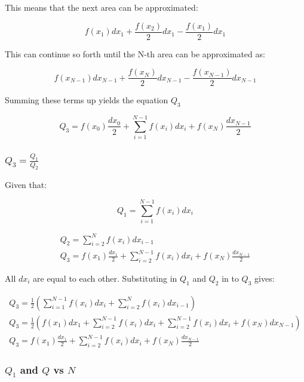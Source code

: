 \documentclass[12pt, a4paper]{article}
\begin{document}
				This means that the next area can be approximated:
				
				$$
				f\left(x_{1}\right) d x_{1}+\frac{f\left(x_{2}\right)}{2} d x_{1}-\frac{f\left(x_{1}\right)}{2} d x_{1}
				$$
				
				This can continue so forth until the $\mathrm{N}$-th area can be approximated as:
				
				$$
				f\left(x_{N-1}\right) d x_{N-1}+\frac{f\left(x_{N}\right)}{2} d x_{N-1}-\frac{f\left(x_{N-1}\right)}{2} d x_{N-1}
				$$
				
				Summing these terms up yields the equation $Q_{3}$
				
				$$
				Q_{3}=f\left(x_{0}\right) \frac{d x_{0}}{2}+\sum_{i=1}^{N-1} f\left(x_{i}\right) d x_{i}+f\left(x_{N}\right) \frac{d x_{N-1}}{2}
				$$
			\subsubsection{$Q_{3} = \frac{Q_{1}}{Q_{2}}$}				
				Given that:
				
				$$
				Q_{1}=\sum_{i=1}^{N-1} f\left(x_{i}\right) d x_{i}
				$$
				
				$$
				\begin{gathered}
					Q_{2}=\sum_{i=2}^{N} f\left(x_{i}\right) d x_{i-1} \\
					Q_{3}=f\left(x_{1}\right) \frac{d x_{1}}{2}+\sum_{i=2}^{N-1} f\left(x_{i}\right) d x_{i}+f\left(x_{N}\right) \frac{d x_{N-1}}{2}
				\end{gathered}
				$$
				
				All $d x_{i}$ are equal to each other. Substituting in $Q_{1}$ and $Q_{2}$ in to $Q_{3}$ gives:
				
				$$
				\begin{gathered}
					Q_{3}=\frac{1}{2}\left(\sum_{i=1}^{N-1} f\left(x_{i}\right) d x_{i}+\sum_{i=2}^{N} f\left(x_{i}\right) d x_{i-1}\right) \\
					Q_{3}=\frac{1}{2}\left(f\left(x_{1}\right) d x_{1}+\sum_{i=2}^{N-1} f\left(x_{i}\right) d x_{i}+\sum_{i=2}^{N-1} f\left(x_{i}\right) d x_{i}+f\left(x_{N}\right) d x_{N-1}\right) \\
					Q_{3}=f\left(x_{1}\right) \frac{d x_{1}}{2}+\sum_{i=2}^{N-1} f\left(x_{i}\right) d x_{i}+f\left(x_{N}\right) \frac{d x_{N-1}}{2}
				\end{gathered}
				$$
			\subsubsection{$Q_{1}$ and $Q$ vs $N$}
				
				
				
\end{document}
